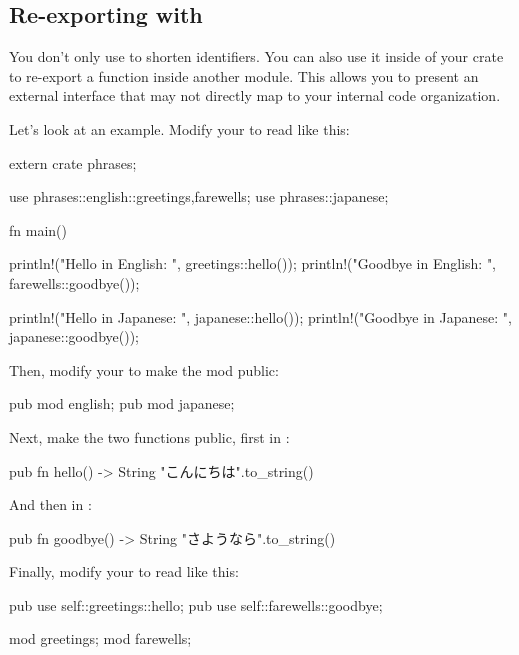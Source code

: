 \subsection*{Re-exporting with }

You don't only use  to shorten identifiers. You can also use it inside of your crate to re-export a function inside another 
module. This allows you to present an external interface that may not directly map to your internal code organization.

\blank

Let's look at an example. Modify your  to read like this:

\begin{rustc}
extern crate phrases;

use phrases::english::{greetings,farewells};
use phrases::japanese;

fn main() {
    println!("Hello in English: {}", greetings::hello());
    println!("Goodbye in English: {}", farewells::goodbye());

    println!("Hello in Japanese: {}", japanese::hello());
    println!("Goodbye in Japanese: {}", japanese::goodbye());
}
\end{rustc}

Then, modify your  to make the  mod public:

\begin{rustc}
pub mod english;
pub mod japanese;
\end{rustc}

Next, make the two functions public, first in :

\begin{rustc}
pub fn hello() -> String {
    "こんにちは".to_string()
}
\end{rustc}

And then in :

\begin{rustc}
pub fn goodbye() -> String {
    "さようなら".to_string()
}
\end{rustc}

Finally, modify your  to read like this:

\begin{rustc}
pub use self::greetings::hello;
pub use self::farewells::goodbye;

mod greetings;
mod farewells;
\end{rustc}

